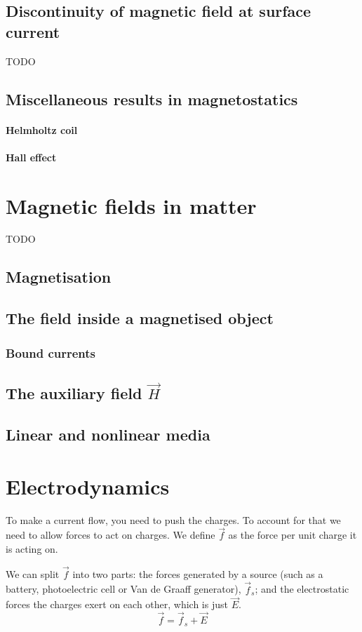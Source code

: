 \section{Discontinuity of magnetic field at surface current}
TODO
\section{Miscellaneous results in magnetostatics}
\subsubsection{Helmholtz coil}
\subsubsection{Hall effect}


\chapter{Magnetic fields in matter}
TODO
\section{Magnetisation}
\section{The field inside a magnetised object}
\subsection{Bound currents}
\section[The auxiliary field \textbf{H}]{The auxiliary field $\vec{H}$}
\section{Linear and nonlinear media}


\chapter{Electrodynamics}
To make a current flow, you need to push the charges. To account for that we need to allow forces to act on charges. We define $\vec{f}$ as the force per unit charge it is acting on.

We can split $\vec{f}$ into two parts: the forces generated by a source (such as a battery, photoelectric cell or Van de Graaff generator), $\vec{f}_s$; and the electrostatic forces the charges exert on each other, which is just $\vec{E}$.
\[ \vec{f} = \vec{f}_s + \vec{E} \]


